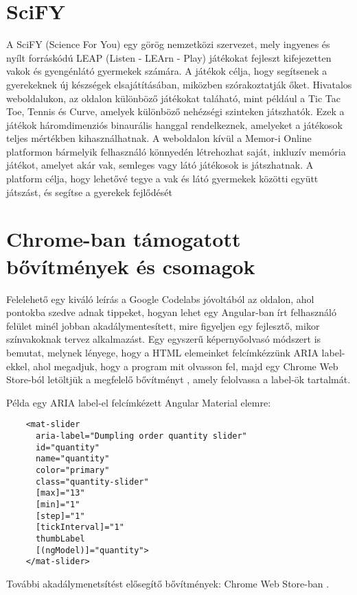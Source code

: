 \documentclass[12pt]{report}
\begin{document}
\section{SciFY}
A SciFY (Science For You) \cite{scify} egy görög nemzetközi szervezet, mely ingyenes és nyílt forráskódú LEAP (Listen - LEArn - Play) játékokat fejleszt kifejezetten vakok és gyengénlátó gyermekek számára. A játékok célja, hogy segítsenek a gyerekeknek új készségek elsajátításában, miközben szórakoztatják őket. Hivatalos weboldalukon, az \cite{gamesforblind} oldalon különböző játékokat taláható, mint például a Tic Tac Toe, Tennis és Curve, amelyek különböző nehézségi szinteken játszhatók. Ezek a játékok háromdimenziós binaurális hanggal rendelkeznek, amelyeket a játékosok teljes mértékben kihasználhatnak. A weboldalon kívül a Memor-i Online platformon bármelyik felhasználó könnyedén létrehozhat saját, inkluzív memória játékot, amelyet akár vak, semleges vagy látó játékosok is játszhatnak. A platform célja, hogy lehetővé tegye a vak és látó gyermekek közötti együtt játszást, és segítse a gyerekek fejlődését

\section{Chrome-ban támogatott bővítmények és csomagok}
Felelehető egy kiváló leírás a Google Codelabs jóvoltából az \cite{a11y} oldalon, ahol pontokba szedve adnak tippeket, hogyan lehet egy Angular-ban írt felhasználó felület minél jobban akadálymentesített, mire figyeljen egy fejlesztő, mikor színvakoknak tervez alkalmazást. Egy egyszerű képernyőolvasó módszert is bemutat, melynek lényege, hogy a HTML elemeinket felcímkézzünk ARIA label-ekkel, ahol megadjuk, hogy a program mit olvasson fel, majd egy Chrome Web Store-ból letöltjük a megfelelő bővítményt \cite{chromevox}, amely felolvassa a label-ök tartalmát.

\pagebreak
Példa egy ARIA label-el felcímkézett Angular Material elemre:

\begin{verbatim}
    <mat-slider
      aria-label="Dumpling order quantity slider"
      id="quantity"
      name="quantity"
      color="primary"
      class="quantity-slider"
      [max]="13"
      [min]="1"
      [step]="1"
      [tickInterval]="1"
      thumbLabel
      [(ngModel)]="quantity">
    </mat-slider>
\end{verbatim}
\newline
További akadálymenetsítést elősegítő bővítmények: Chrome Web Store-ban \cite{extensions}.
\end{document}
